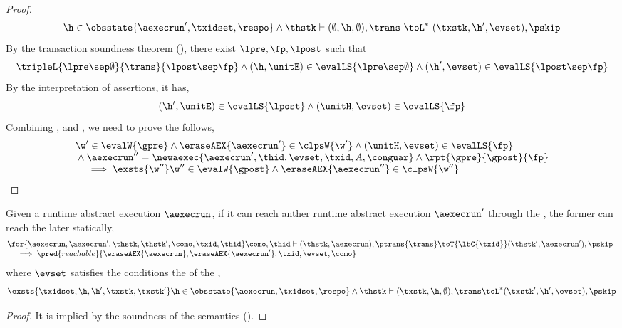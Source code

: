 \begin{proof}
\begin{equation}
    \h \in \obsstate{\aexecrun', \txidset, \respo}
    \land \thstk \vdash (\emptyset, \h, \emptyset) , \trans \ \toL^{*} \  (\txstk, \h', \evset) , \pskip 
\end{equation}
By the transaction soundness theorem (), there exist \( \lpre, \fp, \lpost \) such that
\[ 
\tripleL{\lpre \sep \emptyset}{\trans}{\lpost \sep \fp} \land (\h, \unitE) \in \evalLS{\lpre \sep \emptyset} \land (\h', \evset) \in \evalLS{\lpost \sep \fp}
\]
By the interpretation of assertions, it has,
\begin{equation}
\label{equ:interpretation-local-post}        
(\h', \unitE) \in \evalLS{\lpost} \land (\unitH, \evset) \in \evalLS{\fp}
\end{equation}
Combining ,  and , we need to prove the follows,
\[
    \begin{array}[t]{@{}l@{}}
    \w' \in \evalW{\gpre} 
    \land \eraseAEX{ \aexecrun' } \in \clpsW{\w'}
    \land (\unitH, \evset) \in \evalLS{\fp} \\
    {} \land \aexecrun'' = \newaexec{\aexecrun', \thid, \evset, \txid, A, \conguar } 
    \land \rpt{\gpre}{\gpost}{\fp} \\
    \quad {} \implies 
    \exsts{\w''}
    \w'' \in \evalW{\gpost} 
    \land \eraseAEX{ \aexecrun'' } \in \clpsW{\w''}
    \end{array}
\]
\end{proof}

\begin{lem}
\label{lem:reachable}
Given a runtime abstract execution \( \aexecrun \), if it can reach anther runtime abstract execution \( \aexecrun'\) through the , the former can reach the later statically, \ie
\[
\begin{array}{@{}l}
    \for{\aexecrun, \aexecrun', \thstk, \thstk', \como, \txid, \thid}
    \como, \thid \vdash (\thstk, \aexecrun), \ptrans{\trans}
    \toT{\lbC{\txid}} (\thstk', \aexecrun'), \pskip \\
    \quad {} \implies \pred{reachable}{\eraseAEX{\aexecrun}, \eraseAEX{\aexecrun'}, \txid, \evset, \como}
\end{array}
\]  
where \( \evset \) satisfies the conditions the of the ,
\[
    \exsts{\txidset, \h, \h', \txstk, \txstk'} \h \in \obsstate{\aexecrun, \txidset, \respo} \land \thstk \vdash (\txstk, \h, \emptyset), \trans \toL^{*} (\txstk', \h', \evset ), \pskip
\]
\end{lem}
\begin{proof}
It is implied by the soundness of the semantics ().
\end{proof}
